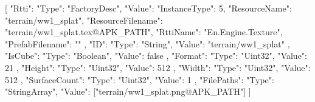 [{
        "Rtti": {
            "Type": "FactoryDesc",
            "Value": {
                "InstanceType": 5,
                "ResourceName": "terrain/ww1_splat",
                "ResourceFilename": "terrain/ww1_splat.tex@APK_PATH",
                "RttiName": "En.Engine.Texture",
                "PrefabFilename": ""
            }
        },
        "ID": {
            "Type": "String",
            "Value": "terrain/ww1_splat"
        },
        "IsCube": {
            "Type": "Boolean",
            "Value": false
        },
        "Format": {
            "Type": "Uint32",
            "Value": 21
        },
        "Height": {
            "Type": "Uint32",
            "Value": 512
        },
        "Width": {
            "Type": "Uint32",
            "Value": 512
        },
        "SurfaceCount": {
            "Type": "Uint32",
            "Value": 1
        },
        "FilePaths": {
            "Type": "StringArray",
            "Value": ["terrain/ww1_splat.png@APK_PATH"]
        }
    }]